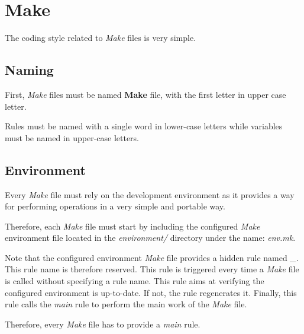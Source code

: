 %
%
%
%
%
%

%
%

\section{Make}
\label{section:make}

The coding style related to \textit{Make} files is very simple.


\subsection{Naming}

First, \textit{Make} files must be named \textbf{Make} file, with the first
letter in upper case letter.

Rules must be named with a single word in lower-case letters while variables
must be named in upper-case letters.


\subsection{Environment}

Every \textit{Make} file must rely on the development environment as it
provides a way for performing operations in a very simple and portable way.

Therefore, each \textit{Make} file must start by including the configured
\textit{Make} environment file located in the \textit{environment/} directory
under the name: \textit{env.mk}.

Note that the configured environment \textit{Make} file provides a hidden
rule named \textit{\_}. This rule name is therefore reserved. This rule is
triggered every time a \textit{Make} file is called without specifying
a rule name. This rule aims at verifying the configured environment is
up-to-date. If not, the rule regenerates it. Finally, this rule calls the
\textit{main} rule to perform the main work of the \textit{Make} file.

Therefore, every \textit{Make} file has to provide a \textit{main} rule.

